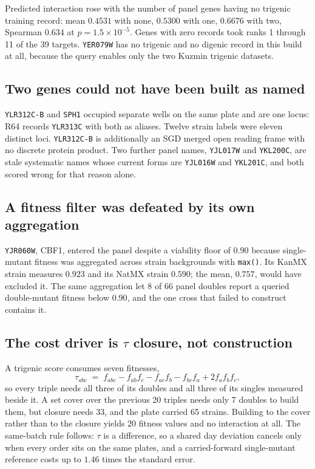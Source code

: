 Predicted interaction rose with the number of panel genes having no trigenic
training record: mean $0.4531$ with none, $0.5300$ with one, $0.6676$ with two,
Spearman $0.634$ at $p = 1.5\times10^{-5}$. Genes with zero records took ranks 1
through 11 of the 39 targets. \texttt{YER079W} has no trigenic and no digenic
record in this build at all, because the query enables only the two Kuzmin
trigenic datasets.

\subsection{Two genes could not have been built as named}

\texttt{YLR312C-B} and \texttt{SPH1} occupied separate wells on the same plate
and are one locus: R64 records \texttt{YLR313C} with both as aliases. Twelve
strain labels were eleven distinct loci. \texttt{YLR312C-B} is additionally an
SGD merged open reading frame with no discrete protein product. Two further
panel names, \texttt{YJL017W} and \texttt{YKL200C}, are stale systematic names
whose current forms are \texttt{YJL016W} and \texttt{YKL201C}, and both scored
wrong for that reason alone.

\subsection{A fitness filter was defeated by its own aggregation}

\texttt{YJR060W}, CBF1, entered the panel despite a viability floor of $0.90$
because single-mutant fitness was aggregated across strain backgrounds with
\texttt{max()}. Its KanMX strain measures $0.923$ and its NatMX strain $0.590$;
the mean, $0.757$, would have excluded it. The same aggregation let 8 of 66 panel
doubles report a queried double-mutant fitness below $0.90$, and the one cross
that failed to construct contains it.

\subsection{The cost driver is $\tau$ closure, not construction}

A trigenic score consumes seven fitnesses,
\begin{equation}
  \tau_{abc} \;=\; f_{abc} - f_{ab}f_{c} - f_{ac}f_{b} - f_{bc}f_{a}
             + 2 f_{a}f_{b}f_{c},
\end{equation}
so every triple needs all three of its doubles and all three of its singles
measured beside it. A set cover over the previous 20 triples needs only 7
doubles to build them, but closure needs 33, and the plate carried 65 strains.
Building to the cover rather than to the closure yields 20 fitness values and no
interaction at all. The same-batch rule follows: $\tau$ is a difference, so a
shared day deviation cancels only when every order sits on the same plates, and
a carried-forward single-mutant reference costs up to $1.46$ times the standard
error.

